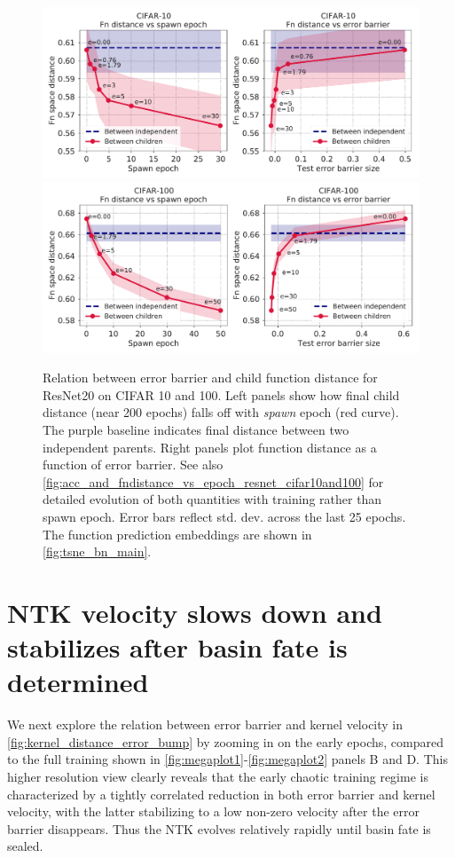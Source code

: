 \documentclass{article}
\begin{document}
\begin{figure}[h]
\centering
\includegraphics[width=0.46\linewidth]{figures/fndistance_ResNet_CIFAR10_87540639.pdf}
\includegraphics[width=0.46\linewidth]{figures/fndistance_ResNet_CIFAR100_64508780.pdf}
\caption{Relation between error barrier and child function distance for ResNet20 on CIFAR 10 and 100. Left panels show how final child distance (near 200 epochs) falls off with {\it spawn} epoch (red curve). The purple baseline indicates final distance between two independent parents. Right panels plot function distance as a function of error barrier. See also \cref{fig:acc_and_fndistance_vs_epoch_resnet_cifar10and100} for detailed evolution of both quantities with training rather than spawn epoch. Error bars reflect std. dev. across the last 25 epochs. The function prediction embeddings are shown in \cref{fig:tsne_bn_main}.}
\label{fig:fnspace_distance}
\end{figure}
%


\section{NTK velocity slows down and stabilizes after basin fate is determined}
\label{sec:bumpvsvel}

We next explore the relation between error barrier and kernel velocity in \cref{fig:kernel_distance_error_bump} by zooming in on the early epochs, compared to the full training shown in \cref{fig:megaplot1}-\ref{fig:megaplot2} panels B and D. This higher resolution view clearly reveals that the early chaotic training regime is characterized by a tightly correlated reduction in both error barrier and kernel velocity, with the latter stabilizing to a low non-zero velocity after the error barrier disappears.  Thus the NTK evolves relatively rapidly until basin fate is sealed.
\end{document}
